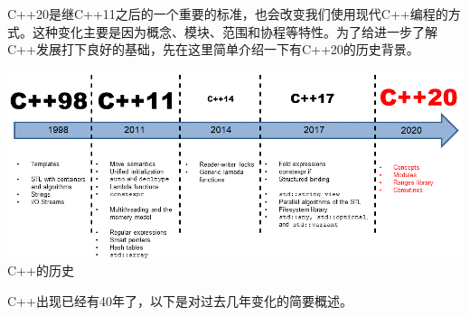 
C++20是继C++11之后的一个重要的标准，也会改变我们使用现代C++编程的方式。这种变化主要是因为概念、模块、范围和协程等特性。为了给进一步了解C++发展打下良好的基础，先在这里简单介绍一下有C++20的历史背景。

\begin{center}
\includegraphics[width=1.0\textwidth]{content/1/chapter1/images/1.png}\\
C++的历史
\end{center}

C++出现已经有40年了，以下是对过去几年变化的简要概述。





























